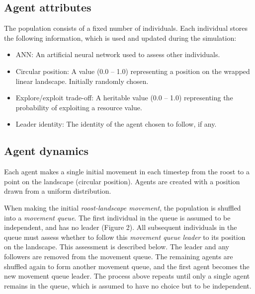 \hypertarget{agent-attributes}{%
\subsection{Agent attributes}\label{agent-attributes}}

The population consists of a fixed number of individuals. Each
individual stores the following information, which is used and updated
during the simulation:

\begin{itemize}
\tightlist
\item
  ANN: An artificial neural network used to assess other individuals.
\item
  Circular position: A value (0.0 -- 1.0) representing a position on the
  wrapped linear landscape. Initially randomly chosen.
\item
  Explore/exploit trade-off: A heritable value (0.0 -- 1.0) representing
  the probability of exploiting a resource value.
\item
  Leader identity: The identity of the agent chosen to follow, if any.
\end{itemize}

\hypertarget{agent-dynamics}{%
\subsection{Agent dynamics}\label{agent-dynamics}}

Each agent makes a single initial movement in each timestep from the
roost to a point on the landscape (circular position). Agents are
created with a position drawn from a uniform distribution.

When making the initial \emph{roost-landscape movement}, the population
is shuffled into a \emph{movement queue}. The first individual in the
queue is assumed to be independent, and has no leader (Figure 2). All
subsequent individuals in the queue must assess whether to follow this
\emph{movement queue leader} to its position on the landscape. This
assessment is described below. The leader and any followers are removed
from the movement queue. The remaining agents are shuffled again to form
another movement queue, and the first agent becomes the new movement
queue leader. The process above repeats until only a single agent
remains in the queue, which is assumed to have no choice but to be
independent.

